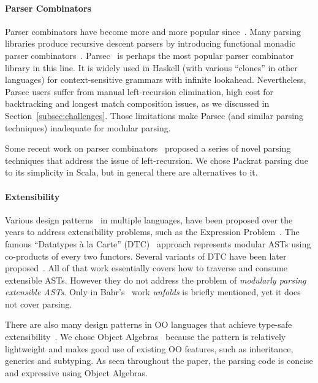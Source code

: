 
\vspace{-5pt}
\paragraph{Parser Combinators} Parser combinators have become more and more
popular since~\cite{burge1975,Wadler1985}. Many parsing libraries produce recursive descent
parsers by introducing functional monadic
parser combinators~\cite{nott237}. Parsec~\cite{Leijen2001} is
perhaps the most popular parser combinator library in this line.
It is widely used in Haskell (with various ``clones'' in other languages)
for context-sensitive grammars with infinite lookahead. Nevertheless,
Parsec users suffer from manual left-recursion elimination,
high cost for backtracking and longest match composition issues,
as we discussed in Section~\ref{subsec:challenges}. Those limitations make Parsec
(and similar parsing techniques) inadequate for modular parsing.

Some recent work on parser
combinators~\cite{Ford2002,Might2011,Frost2008} proposed a series of
novel parsing techniques that address the issue of
left-recursion. We chose Packrat parsing due to its simplicity in Scala,
but in general there are alternatives to it.

\vspace{-5pt}
\paragraph{Extensibility} Various design patterns~\cite{gamma1995design} in multiple
languages, have been proposed over the years to address extensibility
problems, such as the Expression Problem~\cite{wadler1998expression}.
The famous ``Datatypes \`a
la Carte'' (DTC)~\cite{swierstra2008data} approach represents modular ASTs using co-products
of every two functors. Several variants of DTC have been later proposed~\cite{Bahr2011,Bahr2014,Oliveira2015}.
All of that work essentially covers how to traverse and
consume extensible ASTs. However they do not
address the problem of \emph{modularly
parsing extensible ASTs}. Only in Bahr's~\cite{Bahr2011} work \emph{unfolds} is briefly mentioned,
yet it does not cover parsing.

There are also many design patterns in OO languages that achieve
type-safe extensibility~\cite{torgersen2004expression,odersky2005independently,oliveira2009modular,Oliveira:2012,wang2016expression}. We chose Object Algebras~\cite{Oliveira:2012} because the pattern is
relatively lightweight and makes good use of existing OO features,
such as inheritance, generics and subtyping. As seen throughout the paper,
the parsing code is concise and expressive using Object Algebras.

